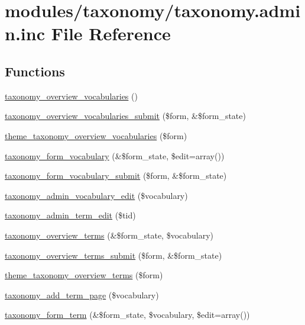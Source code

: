 \hypertarget{taxonomy_8admin_8inc}{
\section{modules/taxonomy/taxonomy.admin.inc File Reference}
\label{taxonomy_8admin_8inc}
}
\subsection*{Functions}
\begin{CompactItemize}
\item 
\hyperlink{group__forms_g1540d991eabc53c2c1af6629455035ff}{taxonomy\_\-overview\_\-vocabularies} ()
\item 
\hyperlink{taxonomy_8admin_8inc_2c0c58c11c7f85fa38bab165004f98e2}{taxonomy\_\-overview\_\-vocabularies\_\-submit} (\$form, \&\$form\_\-state)
\item 
\hyperlink{group__themeable_gc13e7fb950bcb43c38a2bf373d5ea348}{theme\_\-taxonomy\_\-overview\_\-vocabularies} (\$form)
\item 
\hyperlink{group__forms_gba5c105f6b3e1a7e85f65fdaa067e0eb}{taxonomy\_\-form\_\-vocabulary} (\&\$form\_\-state, \$edit=array())
\item 
\hyperlink{taxonomy_8admin_8inc_5fe8d2d826372a29a068cd2c39e38636}{taxonomy\_\-form\_\-vocabulary\_\-submit} (\$form, \&\$form\_\-state)
\item 
\hyperlink{taxonomy_8admin_8inc_0aad51b0e07b0eed3689a78edc2b17cb}{taxonomy\_\-admin\_\-vocabulary\_\-edit} (\$vocabulary)
\item 
\hyperlink{taxonomy_8admin_8inc_120bfb94c940af0d98d447e47aec0c0b}{taxonomy\_\-admin\_\-term\_\-edit} (\$tid)
\item 
\hyperlink{group__forms_g27f78faeeac394ba8359e22501c5b333}{taxonomy\_\-overview\_\-terms} (\&\$form\_\-state, \$vocabulary)
\item 
\hyperlink{taxonomy_8admin_8inc_fb672457712a0a215cdeaa91748b4517}{taxonomy\_\-overview\_\-terms\_\-submit} (\$form, \&\$form\_\-state)
\item 
\hyperlink{group__themeable_ga6eed299548007f120519d1e353b811f}{theme\_\-taxonomy\_\-overview\_\-terms} (\$form)
\item 
\hyperlink{taxonomy_8admin_8inc_fc43b3075dc456fcc785d0aa4f65bd3d}{taxonomy\_\-add\_\-term\_\-page} (\$vocabulary)
\item 
\hyperlink{group__forms_gc57918eae4868ce5e1c8d62c995ae295}{taxonomy\_\-form\_\-term} (\&\$form\_\-state, \$vocabulary, \$edit=array())

\end{CompactItemize}
